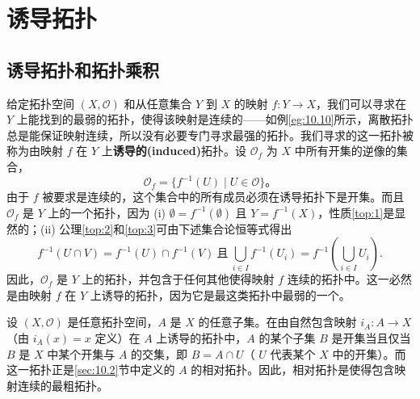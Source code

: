 \section{诱导拓扑}
\subsection{诱导拓扑和拓扑乘积}

给定拓扑空间 $(X,\mathcal{O} )$ 和从任意集合 $Y$ 到 $X$ 的映射 $f:Y\rightarrow X$，我们可以寻求在 $Y$ 上能找到的最弱的拓扑，使得该映射是连续的——如例\ref{eg:10.10}所示，离散拓扑总是能保证映射连续，所以没有必要专门寻求最强的拓扑。我们寻求的这一拓扑被称为由映射 $f$ 在 $Y$ 上\textbf{诱导的(induced)}拓扑。设 $\mathcal{O}_{f}$ 为 $X$ 中所有开集的逆像的集合，
\begin{equation*}
\mathcal{O}_{f} =\{f^{-1} (U)\mid U\in \mathcal{O} \}。
\end{equation*}
由于 $f$ 被要求是连续的，这个集合中的所有成员必须在诱导拓扑下是开集。而且$\mathcal{O}_{f}$ 是 $Y$ 上的一个拓扑，因为 (i)  $\emptyset =f^{-1} (\emptyset )$ 且 $Y=f^{-1} (X)$，性质\ref{top:1}是显然的；(ii) 公理\ref{top:2}和\ref{top:3}可由下述集合论恒等式得出
\begin{equation*}
f^{-1}( U\cap V) =f^{-1}( U) \cap f^{-1}( V) \ 且\ \bigcup _{i\in I} f^{-1}( U_{i}) =f^{-1}\left(\bigcup _{i\in I} U_{i}\right) .
\end{equation*}
因此，$\mathcal{O}_{f}$ 是 $Y$ 上的拓扑，并包含于任何其他使得映射 $f$ 连续的拓扑中。这一必然是由映射 $f$ 在 $Y$ 上诱导的拓扑，因为它是最这类拓扑中最弱的一个。

\begin{eg}\label{eg:10.12}
	设 $(X,\mathcal{O} )$ 是任意拓扑空间，$A$ 是 $X$ 的任意子集。在由自然包含映射 $i_{A} :A\rightarrow X$ （由 $i_{A}( x) =x$ 定义）在 $A$ 上诱导的拓扑中，$A$ 的某个子集 $B$ 是开集当且仅当 $B$ 是 $X$ 中某个开集与 $A$ 的交集，即 $B=A\cap U$（ $U$ 代表某个 $X$ 中的开集）。而这一拓扑正是\ref{sec:10.2}节中定义的 $A$ 的相对拓扑。因此，相对拓扑是使得包含映射连续的最粗拓扑。
\end{eg}

